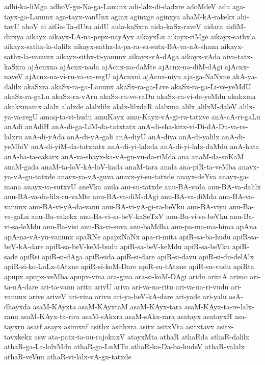 {adhi-ka-liMga
adhoV-gu-Na-ga-Lanunx
adi-lalx-di-dadxre
adoMdeV
adu
aga-tayx-ga-Lanunx
aga-tayx-vanUnx
aginx
aginxge
aginxya
ahaM-kA-rakekx
ahi-tavU
ahoV
ai
aiGa-Ta-dUra
aidU
aida-kaSxra
aida-kaSx-raveV
aidara
aidiM-dirxya
aikayx
aikayx-LA-na-pepx-nayAyx
aikayxLu
aikayx-riMge
aikayx-sathxla
aikayx-sathx-la-dalilx
aikayx-sathx-la-pa-ra-va-sutx-BA-va-nA-shana
aikayx-sathx-la-vanunx
aikayx-sithx-ti-yanunx
aikayx-vA-dAga
aikayx-vAda
aiva-tatx-kaSxra
ajAcnxna
ajAcnx-nada
ajAcnx-na-daMte
ajAcnx-na-diM-dAgi
ajAcnx-naveV
ajAcnx-na-vi-ru-va-va-regU
ajAcnxni
ajAcnx-niyu
aja-ga-NaNxne
akA-ya-dalilx
akaSxra
akaSx-ra-ga-Lanunx
akaSx-ra-ga-Live
akaSx-ra-ga-Li-ve-yeMdU
akaSx-ra-gaLu
akaSx-ra-vAru
akaSx-ra-ve-raDu
akaSx-ra-vi-de-yeMdu
akakxma
akakxmamx
alalx
alalxde
alalxlilx
alalx-lilxdaR
alalxma
alilx
alilxM-daleV
alilx-ya-va-regU
amaq-ta-vi-hudu
amuKayx
amu-Kayx-vA-gi-ru-tatxve
anA-cA-ri-gaLu
anAdi
anAdiH
anA-di-ga-LiM-da-tatxtatx
anA-di-sha-kitx-vi-Di-dA-Du-va-re-lalxru
anA-di-yAda
anA-di-yA-gali
anA-diyU
anA-diya
anA-di-yalilx
anA-di-yeMbiV
anA-di-yiM-da-tatxtatx
anA-di-yi-lalxda
anA-di-yi-lalx-daMdu
anA-hata
anA-ha-ta-cakarx
anA-va-shayx-ka-vA-gu-vu-da-riMda
ana
anaM-da-suKaM
anaM-gada
anaM-ta-loV-kA-loV-kada
anaM-tara
anala
ana-piR-ta-veMba
anavx-ya-vA-gu-tatxde
anavx-ya-vA-guva
anavx-yi-su-tatxde
anayx-deYva
anayx-ga-mana
anayx-va-sutxvU
aneVka
anila
ani-su-tatxde
anu-BA-vada
anu-BA-va-dalilx
anu-BA-va-da-lilx-ru-vaMte
anu-BA-va-diM-dAgi
anu-BA-va-diMda
anu-BA-va-vanunx
anu-BA-vi-yA-da-vanu
anu-BA-vi-yA-gi-ra-beVku
anu-BA-viyu
anu-Ba-va-gaLu
anu-Ba-vakekx
anu-Ba-vi-sa-beV-kaSeTxV
anu-Ba-vi-sa-beVku
anu-Ba-vi-sa-leMdu
anu-Ba-visi
anu-Ba-vi-suva
anu-baMdha
anu-pa-ma-ma-hima
apAna
apA-na-vA-yu-vanunx
apaRNe
apapxNaNx
apa-ri-mita
apiR-sa-ba-hudu
apiR-sa-beV-kA-dare
apiR-sa-beV-keM-budu
apiR-sa-beV-keMdu
apiR-sa-beVku
apiR-sade
apiRsi
apiR-si-dAga
apiR-sida
apiR-si-dare
apiR-si-davu
apiR-si-du-delAlx
apiR-si-ko-LuLx-tAtxne
apiR-si-koM-Dare
apiR-su-tAtxne
apiR-su-vudu
apiRta
apupx
apupx-veMba
apupx-vina
ara-gina
ara-si-koM-DAgi
aridu
arimA
arimo
ari-ta-nA-dare
ari-ta-vanu
aritu
arivU
ariva
ari-va-na-ritu
ari-va-na-ri-vudu
ari-vanunx
arive
ariveV
ari-vina
arivu
ari-ya-beV-kA-dare
ari-yade
ari-yalu
asA-dhayxda
asaM-KAyxta
asaM-KAyxtaM
asaM-KAyx-tara
asaM-KAyx-ta-re-lalx-ranu
asaM-KAyx-ta-rira
asaM-sAkxra
asaM-sAkx-rara
asatayx
asatayxH
asa-tayxru
asatf
asayx
asimxnf
asithx
asithxra
asitx
asitxVta
asitxtavx
asitx-tavxkekx
asw
ata-patx-ta-nu-rajoknxV
atayxMta
athaR
athaRda
athaR-dalilx
athaR-ga-La-lolxMdu
athaR-ga-LuMTu
athaR-ko-Da-ba-hudeV
athaR-valalx
athaR-veVnu
athaR-vi-lalx-vA-gu-tatxde
}
